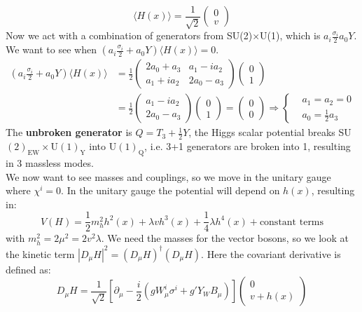 \documentclass[../main.tex]{subfiles}
\begin{document}
\[
\langle H(x)\rangle=\frac{1}{\sqrt{2}}\begin{pmatrix}
    0\\v
\end{pmatrix}
\]
Now we act with a combination of generators from SU(2)$\times$U(1), which is $a_i\frac{\sigma_i}{2}a_0Y$. We want to see when $(a_i\frac{\sigma_i}{2}+a_0Y)\langle H(x)\rangle=0$.
\begin{align*}
\left(a_i\frac{\sigma_i}{2}+a_0Y\right)\langle H(x)\rangle&=\frac{1}{2}\left(\begin{array}{cc}
    2a_0+a_3 & a_1-ia_2 \\
    a_1+ia_2 & 2a_0-a_3
\end{array}\right)\begin{pmatrix}
    0\\1
\end{pmatrix}\\
&=\frac{1}{2}\begin{pmatrix}
    a_1-ia_2\\2a_0-a_3
\end{pmatrix}
\begin{pmatrix}
    0\\1
\end{pmatrix}=\begin{pmatrix}
    0\\0
\end{pmatrix}\Rightarrow\left\{\begin{aligned}
    &a_1=a_2=0\\
    &a_0=\frac{1}{2}a_3
\end{aligned}\right.
\end{align*}
The \textbf{unbroken generator} is $Q=T_3+\frac{1}{2}Y$, the Higgs scalar potential breaks SU$(2)_{\text{EW}}\times$U$(1)_{\text{Y}}$ into U$(1)_{\text{Q}}$, i.e. 3+1 generators are broken into 1, resulting in 3 massless modes.\\
We now want to see masses and couplings, so we move in the unitary gauge where $\chi^i=0$. In the unitary gauge the potential will depend on $h(x)$, resulting in:
\[
V(H)=\frac{1}{2}m_h^2h^2(x)+\lambda vh^3(x)+\frac{1}{4}\lambda h^4(x)+\text{constant terms}
\]
with $m_h^2=2\mu^2=2v^2\lambda$. We need the masses for the vector bosons, so we look at the kinetic term
$|D_\mu H|^2=(D_\mu H)^\dagger(D_\mu H)$. Here the covariant derivative is defined as:
\[
D_\mu H=\frac{1}{\sqrt{2}}\left[\partial_\mu-\frac{i}{2}(gW_\mu^i\sigma^i+g'Y_WB_\mu)\right]\begin{pmatrix}0 \\ v+h(x)\end{pmatrix}
\]
\end{document}
